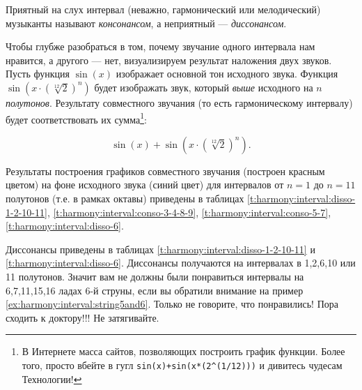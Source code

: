 Приятный на слух интервал (неважно, гармонический или мелодический) музыканты называют \emph{консонансом}, а неприятный --- \emph{диссонансом}. 

Чтобы глубже разобраться в том, почему звучание одного интервала нам нравится, а другого --- нет, визуализируем результат наложения двух звуков. Пусть функция $\sin(x)$ изображает основной тон исходного звука. Функция $\sin(x\cdot(\sqrt[12]{2})^n)$ будет изображать звук, который \emph{выше} исходного на $n$ \emph{полутонов}. Результату совместного звучания (то есть гармоническому интервалу) будет соответствовать их сумма\footnote{В Интернете масса сайтов, позволяющих построить график функции. Более того, просто вбейте в гугл \texttt{sin(x)+sin(x*(2\^{}(1/12)))} и дивитесь чудесам Технологии!}:

\begin{equation}
    \label{eq:harmony:interval:sin}
    \sin(x) + \sin(x\cdot(\sqrt[12]{2})^n).
\end{equation}

Результаты построения графиков совместного звучания (построен красным цветом) на фоне исходного звука (синий цвет) для интервалов от $n=1$ до $n=11$ полутонов (т.е. в рамках октавы) приведены в таблицах \ref{t:harmony:interval:disso-1-2-10-11}, \ref{t:harmony:interval:conso-3-4-8-9}, \ref{t:harmony:interval:conso-5-7}, \ref{t:harmony:interval:disso-6}.

Диссонансы приведены в таблицах \ref{t:harmony:interval:disso-1-2-10-11} и \ref{t:harmony:interval:disso-6}. Диссонансы получаются на интервалах в 1,2,6,10 или 11 полутонов. Значит вам не должны были понравиться интервалы на 6,7,11,15,16 ладах 6-й струны, если вы обратили внимание на пример \ref{ex:harmony:interval:string5and6}. Только не говорите, что понравились! Пора сходить к доктору!!! Не затягивайте. 

